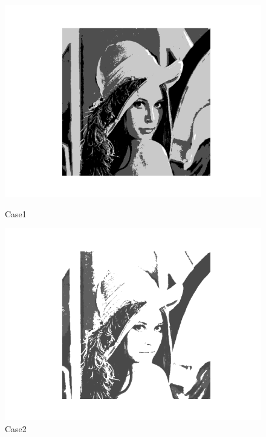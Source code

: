 \documentclass{article}
\begin{document}
\begin{figure}[h]
	\begin{minipage}[t]{0.2\textwidth}%
		\centering
		\includegraphics[width=\textwidth]{GA_1.png}
		\caption{Case1}%
		\end{minipage}
	\begin{minipage}[t]{0.2\textwidth}
		\centering
		\includegraphics[width=\textwidth]{GA_2.png}
		\caption{Case2}
	\end{minipage}
	\begin{minipage}[t]{0.2\textwidth}
		\centering

\end{minipage}
\end{figure}
\end{document}
